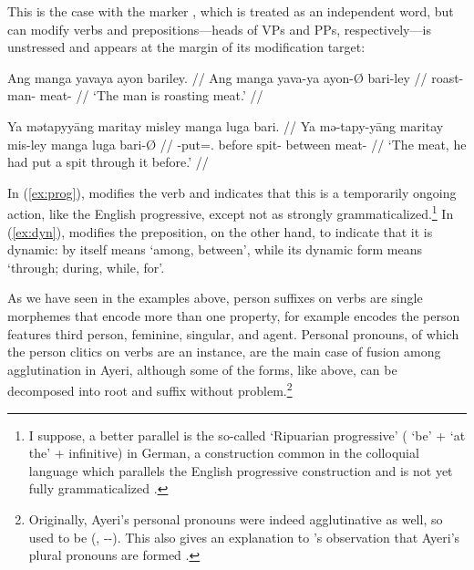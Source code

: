 This is the case with the marker , which is treated as an 
independent word, but can modify verbs and prepositions---heads of VPs and 
PPs, respectively---is unstressed and appears at the margin of its 
modification target:

\pex
\a\label{ex:prog}\begingl
	\gla Ang manga yavaya ayon bariley. //
	\glb Ang manga yava-ya ayon-Ø bari-ley //
	\glc \AgtT{} \Prog{} roast-\TsgM{} man-\Top{} meat-\PargI{} //
	\glft `The man is roasting meat.' //
\endgl

\a\label{ex:dyn}\begingl
	\gla Ya mətapyyāng maritay misley manga luga bari. //
	\glb Ya mə-tapy-yāng maritay mis-ley manga luga bari-Ø //
	\glc \LocT{} \Pst{}-put=\TsgM{}.\Aarg{} before spit-\PargI{} \Dyn{} 
		between meat-\Top{} //
	\glft `The meat, he had put a spit through it before.' //
\endgl

\xe

In (\ref{ex:prog}),  modifies the verb  
and indicates that this is a temporarily ongoing action, like the English 
progressive, except not as strongly grammaticalized.\footnote{I suppose, a 
better parallel is the so-called  `Ripuarian 
progressive' ( `be' +  `at the' + infinitive) in German, a 
construction common in the colloquial language which parallels the English 
progressive construction and is not yet fully grammaticalized 
\citep[435]{dudengram2016}.
% 
}
%
In (\ref{ex:dyn}),  modifies the preposition, on the other 
hand, to indicate that it is dynamic:  by itself means `among, 
between', while its dynamic form  means `through; 
during, while, for'.

As we have seen in the examples above, person suffixes on verbs are single 
morphemes that encode more than one property, for example  
encodes the person features third person, feminine, singular, and agent. 
Personal pronouns, of which the person clitics on 
verbs are an instance, are the main case of fusion among agglutination in Ayeri, 
although some of the forms, like  above, can be 
decomposed into root and suffix without problem.\footnote{Originally, Ayeri's 
personal pronouns were indeed agglutinative as well, so  
used to be  (, \Tsg{}-\F{}-\Aarg{}). This 
also gives an explanation to \citet{boga2016}'s observation that Ayeri's plural 
pronouns are formed .}

